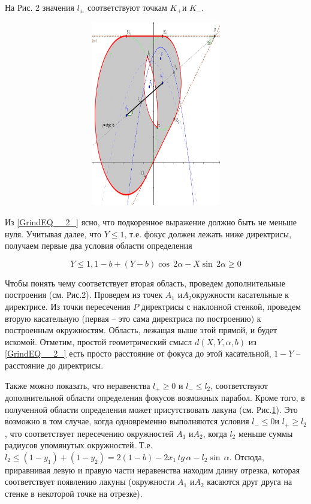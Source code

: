 \documentclass[a4paper]{article}
\begin{document}
На Рис. 2 значения $l_{\pm } $ соответствуют точкам $K_{+} $и $K_{-} $.

\begin{figure}[ht]
  \centering
 \includegraphics[width=143.6mm, height=80.7mm, viewport=3mm 4mm 205mm 292mm]{image5}\\
  \caption{}\label{image5}
\end{figure}

Из \eqref{GrindEQ__2_} ясно, что подкоренное выражение должно быть не меньше нуля. Учитывая далее, что $Y\le 1$, т.е. фокус должен лежать ниже директрисы, получаем первые два условия области определения

\begin{equation} \label{GrindEQ__3_} Y\le 1,  1-b+\left(Y-b\right)\cos \, 2\alpha -X\sin \, 2\alpha \ge 0 \end{equation}

Чтобы понять чему соответствует вторая область, проведем дополнительные построения (см. Рис.2). Проведем из точек $A_{1} $ и$A_{2} $окружности касательные  к директрисе. Из точки пересечения $P$ директрисы с наклонной стенкой, проведем вторую касательную (первая -- это сама директриса по построению) к построенным окружностям. Область, лежащая выше этой прямой, и будет искомой. Отметим, простой геометрический смысл $d\left(X,Y,\alpha ,b\right)$ из \eqref{GrindEQ__2_} есть просто расстояние от фокуса до этой касательной, $1-Y$ -- расстояние до директрисы.

Также можно показать, что неравенства $l_{+} \ge 0$ и  $l_{-} \le l_{2} $, соответствуют дополнительной области определения фокусов возможных парабол. Кроме того, в полученной области определения может присутствовать лакуна (см. Рис.\ref{image5}). Это возможно в том случае, когда одновременно выполняются условия  $l_{-} \le 0$и $l_{+} \ge l_{2} $, что соответствует пересечению окружностей  $A_{1} $ и$A_{2} $, когда $l_{2} $ меньше суммы радиусов упомянутых окружностей. Т.е. $l_{2} \le \left(1-y_{1} \right)+\left(1-y_{2} \right)=2\left(1-b\right)-2x_{1} \, tg\, \alpha -l_{2} \sin \, \alpha $. Отсюда, приравнивая левую и правую части неравенства находим длину отрезка, которая соответствует появлению лакуны (окружности $A_{1} $ и$A_{2} $ касаются друг друга на стенке в некоторой точке на отрезке).
\end{document}
